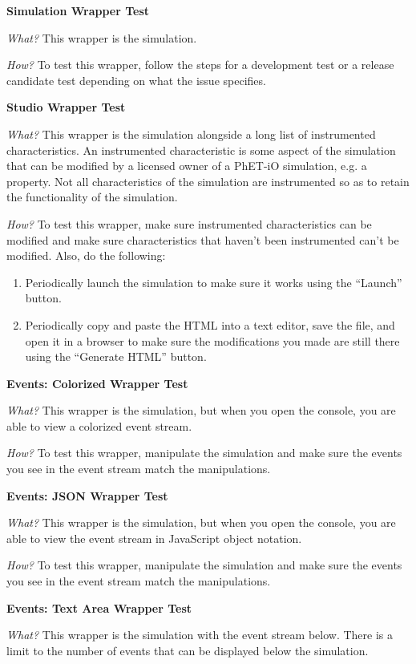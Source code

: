 \documentclass[titlepage]{article}
\begin{document}
\textbf{Simulation Wrapper Test}

\textit{What?} This wrapper is the simulation.

\textit{How?} To test this wrapper, follow the steps for a development test or a release candidate test depending on what the issue specifies.

\textbf{Studio Wrapper Test}

\textit{What?} This wrapper is the simulation alongside a long list of instrumented characteristics. An instrumented characteristic is some aspect of the simulation that can be modified by a licensed owner of a PhET-iO simulation, e.g. a property. Not all characteristics of the simulation are instrumented so as to retain the functionality of the simulation.

\textit{How?} To test this wrapper, make sure instrumented characteristics can be modified and make sure characteristics that haven't been instrumented can't be modified. Also, do the following:

		\begin{enumerate}
			\item Periodically launch the simulation to make sure it works using the ``Launch'' button.
			\item Periodically copy and paste the HTML into a text editor, save the file, and open it in a browser to make sure the modifications you made are still there using the ``Generate HTML'' button.
		\end{enumerate}

\textbf{Events: Colorized Wrapper Test}

\textit{What?} This wrapper is the simulation, but when you open the console, you are able to view a colorized event stream.

\textit{How?} To test this wrapper, manipulate the simulation and make sure the events you see in the event stream match the manipulations.

\textbf{Events: JSON Wrapper Test}

\textit{What?} This wrapper is the simulation, but when you open the console, you are able to view the event stream in JavaScript object notation.

\textit{How?} To test this wrapper, manipulate the simulation and make sure the events you see in the event stream match the manipulations.

\textbf{Events: Text Area Wrapper Test}

\textit{What?} This wrapper is the simulation with the event stream below. There is a limit to the number of events that can be displayed below the simulation.
\end{document}
